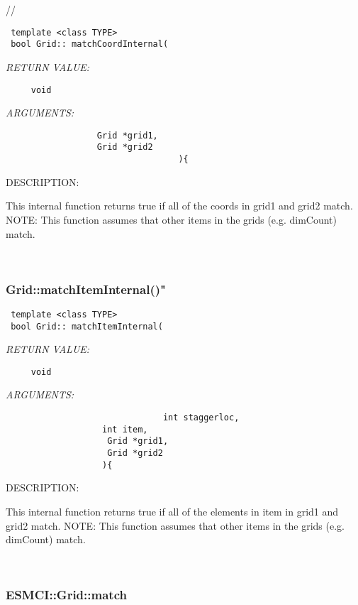   //
\begin{verbatim} template <class TYPE>
 bool Grid:: matchCoordInternal(\end{verbatim}{\em RETURN VALUE:}
\begin{verbatim}     void\end{verbatim}{\em ARGUMENTS:}
\begin{verbatim}                  Grid *grid1,
                  Grid *grid2
                                  ){\end{verbatim}
{\sf DESCRIPTION:\\ }


    This internal function returns true if all of the coords in grid1 and grid2 match. 
   NOTE: This function assumes that other items in the grids (e.g. dimCount) match. 
   
 
\mbox{}\hrulefill\
 
\subsubsection [Grid::matchItemInternal()"] {Grid::matchItemInternal()"}


  
\begin{verbatim} template <class TYPE>
 bool Grid:: matchItemInternal(\end{verbatim}{\em RETURN VALUE:}
\begin{verbatim}     void\end{verbatim}{\em ARGUMENTS:}
\begin{verbatim}     
                               int staggerloc,
                   int item,
                    Grid *grid1,
                    Grid *grid2
                   ){\end{verbatim}
{\sf DESCRIPTION:\\ }


    This internal function returns true if all of the elements in item in grid1 and grid2 match. 
   NOTE: This function assumes that other items in the grids (e.g. dimCount) match. 
   
 
\mbox{}\hrulefill\
 
\subsubsection [ESMCI::Grid::match] {ESMCI::Grid::match}


